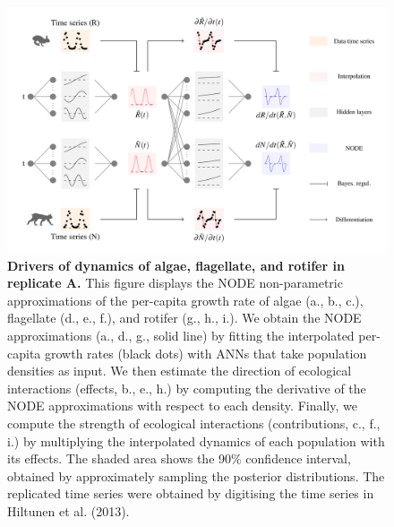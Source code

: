 \documentclass[11pt, oneside]{article}
\begin{document}
\newpage
\begin{figure}[H]
\begin{center}
\includegraphics[width=\linewidth,page=5]{figures/main.pdf}
\caption{
    \textbf{Drivers of dynamics of algae, flagellate, and rotifer in replicate A.}
    This figure displays the NODE non-parametric approximations of the per-capita growth rate of algae (a., b., c.), flagellate (d., e., f.), and rotifer (g., h., i.).
    We obtain the NODE approximations (a., d., g., solid line) by fitting the interpolated per-capita growth rates (black dots) with ANNs that take population densities as input.
    We then estimate the direction of ecological interactions (effects, b., e., h.) by computing the derivative of the NODE approximations with respect to each density.
    Finally, we compute the strength of ecological interactions (contributions, c., f., i.) by multiplying the interpolated dynamics of each population with its effects.
    The shaded area shows the 90\% confidence interval, obtained by approximately sampling the posterior distributions. 
    The replicated time series were obtained by digitising the time series in Hiltunen et al. (2013).
}
\end{center}
\end{figure}
\newpage
\end{document}
